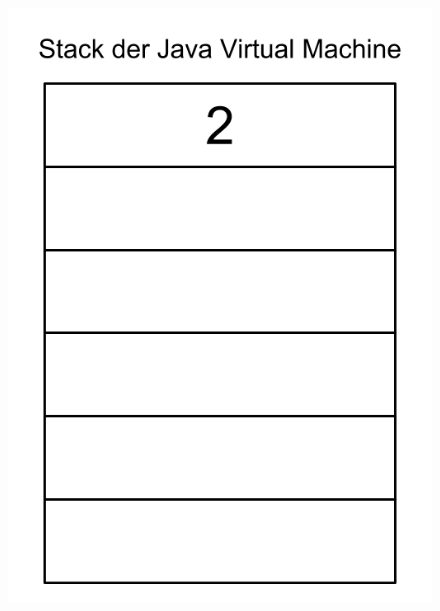 \begin{figure}[htb]
\begin{center}
{	\includegraphics[scale=0.2]{pics/stack_visual(1).png}
}\\
\end{center}
\end{figure}
